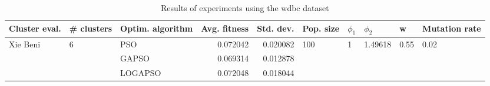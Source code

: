 \begin{table}
\centering
\caption{Results of experiments using the wdbc dataset}
\begin{tabular}{lllrrlllll}
\toprule
            Cluster eval. &        \# clusters & Optim. algorithm &  Avg. fitness &  Std. dev. &            Pop. size &         $\phi_{1}$ &               $\phi_{2}$ &                     w &         Mutation rate \\
\midrule
\multirow{3}{*}{Xie Beni} & \multirow{3}{*}{6} &              PSO &      0.072042 &   0.020082 & \multirow{3}{*}{100} & \multirow{3}{*}{1} & \multirow{3}{*}{1.49618} & \multirow{3}{*}{0.55} & \multirow{3}{*}{0.02} \\
                          &                    &            GAPSO &      0.069314 &   0.012878 &                      &                    &                          &                       &                       \\
                          &                    &          LOGAPSO &      0.072048 &   0.018044 &                      &                    &                          &                       &                       \\
\bottomrule
\end{tabular}
\end{table}
